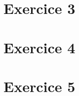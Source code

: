 \documentclass[a4paper, frenchb, 11pt]{article}
\begin{document}
\newpage

\section*{Exercice 3}
\newpage

\section*{Exercice 4}

\newpage

\section*{Exercice 5}
\newpage

\renewcommand\refname{Ressources utilisées}
\begin{thebibliography}{5} %
\end{thebibliography}
\end{document}
